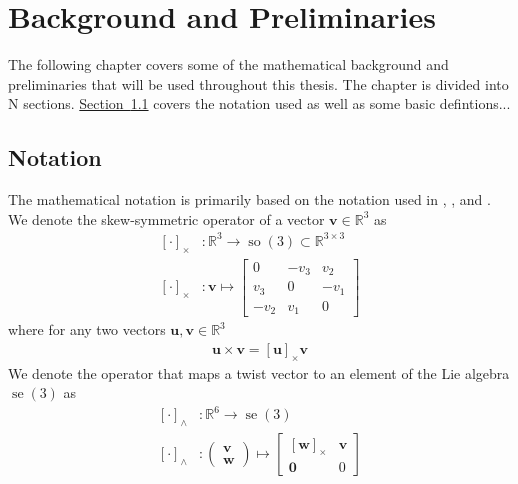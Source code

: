\chapter{Background and Preliminaries}

The following chapter covers some of the mathematical background and preliminaries
that will be used throughout this thesis. The chapter is divided into N sections.
\hyperref[sec:bp:notation]{Section~\ref*{sec:bp:notation}} covers the notation used
as well as some basic defintions... 

\section{Notation}
\label{sec:bp:notation}

The mathematical notation is primarily based on the notation used in \cite{modsim},
\cite{fossen2021}, and \cite{sola2017}. We denote the skew-symmetric operator
of a vector $\bm{v} \in \mathbb{R}^3$ as
\begin{subequations}
\begin{align}
    [\cdot]_{\times} &: \mathbb{R}^3 \to \operatorname{so}(3) \subset \mathbb{R}^{3\times 3} \\
    [\cdot]_{\times} &: \bm{v} \mapsto 
    \begin{bmatrix}
        0 & -v_3 & v_2 \\
        v_3 & 0 & -v_1 \\
        -v_2 & v_1 & 0
    \end{bmatrix}
\end{align}
\end{subequations}
where for any two vectors $\bm{u}, \bm{v} \in \mathbb{R}^3$
\begin{align}
    \bm{u} \times \bm{v} = [\bm{u}]_{\times} \bm{v}
\end{align}
We denote the operator that maps a twist vector to an element of the Lie algebra
$\operatorname{se}(3)$ as
\begin{subequations}
\begin{align}
    [\cdot]_{\wedge} &: \mathbb{R}^6 \to \operatorname{se}(3) \\
    [\cdot]_{\wedge} &: \begin{pmatrix} \bm{v} \\ \bm{w} \end{pmatrix} \mapsto
        \begin{bmatrix}
            [\bm{w}]_{\times} & \bm{v} \\
            \bm{0} & 0
        \end{bmatrix}
\end{align}
\end{subequations}

